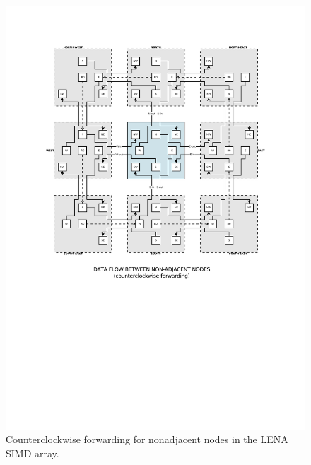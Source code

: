 \begin{figure}[h]
  \centering
  \includegraphics[width=\linewidth,clip,trim=0 0 0 0]
                  {fig/fpga/fpga-simd-fwrd.pdf}
  \caption[Data forwarding.]{Counterclockwise forwarding for nonadjacent nodes in the \ac{LENA} \ac{SIMD} array.}
  \label{fig:fpga-simd-fwrd}
\end{figure}
